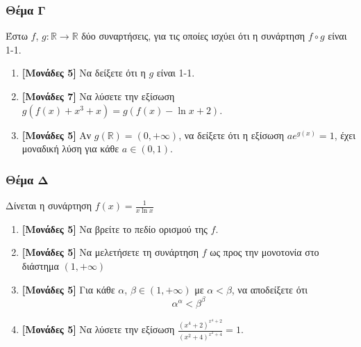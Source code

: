 \documentclass[12pt]{article}
\begin{document}
\section*{Θέμα Γ}
  \noindent
  Έστω $f$, $g:\mathbb{R}\to \mathbb{R}$ δύο συναρτήσεις, για τις οποίες ισχύει ότι η συνάρτηση $f\circ g$ είναι 1-1.
  \begin{enumerate}
    \item \textbf{[Μονάδες 5]} Να δείξετε ότι η $g$ είναι 1-1.
    \item \textbf{[Μονάδες 7]} Να λύσετε την εξίσωση $g\left( f(x)+x^3+x\right)=g\left( f(x)-\ln x+ 2\right)$.
    \item \textbf{[Μονάδες 5]} Αν $g(\mathbb{R})=(0,+\infty)$, να δείξετε ότι η εξίσωση $ae^{g(x)}=1$, έχει μοναδική λύση για κάθε $a\in (0,1)$.
  \end{enumerate}

  \section*{Θέμα Δ}
    \noindent
    Δίνεται η συνάρτηση $f(x)=\frac{1}{x\ln x}$
    \begin{enumerate}
      \item \textbf{[Μονάδες 5]} Να βρείτε το πεδίο ορισμού της $f$.
      \item \textbf{[Μονάδες 5]} Να μελετήσετε τη συνάρτηση $f$ ως προς την μονοτονία στο διάστημα $(1,+\infty)$
      \item \textbf{[Μονάδες 5]} Για κάθε $α$, $β\in (1,+\infty)$ με $α<β$, να αποδείξετε ότι
$$α^α<β^β$$
      \item \textbf{[Μονάδες 5]} Να λύσετε την εξίσωση $\frac{(x^4+2)^{x^4+2}}{(x^2+4)^{x^2+4}}=1$.
    \end{enumerate}

\vspace{2\baselineskip}

\part*{}
\end{document}
